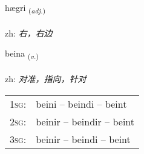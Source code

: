 \documentclass[frontgrid, backgrid]{flacards}\usepackage[]{graphicx}\usepackage[]{color}
\begin{document}
\renewcommand{\flhead}{\vskip5pt \fboxsep=0pt {\small\bfseries\footnotesize Lýsingarorð | 形容词}}
\renewcommand{\fcfoot}{\vskip5pt \fboxsep=0pt \hspace{2pt}{\small\bfseries\footnotesize 2K}}

\renewcommand{\blhead}{\vskip5pt {\small\bfseries\footnotesize Lýsingarorð | 形容词 }}
\renewcommand{\bcfoot}{\vskip5pt \hspace{2pt}{\small\bfseries\footnotesize 2K}}


{hægri \small{\textsubscript{(\textit{adj.})}} \\[1ex] %
\textphonetic{[haiɣrɪ]} \\
zh: \emph{右，右边} \\  [2ex]
\renewcommand*{\arraystretch}{0.8}
}

\renewcommand{\flhead}{\vskip5pt \fboxsep=0pt {\small\bfseries\footnotesize Sagnorð | 动词}}
\renewcommand{\fcfoot}{\vskip5pt \fboxsep=0pt \hspace{2pt}{\small\bfseries\footnotesize 2K}}

\renewcommand{\blhead}{\vskip5pt {\small\bfseries\footnotesize Sagnorð | 动词 }}
\renewcommand{\bcfoot}{\vskip5pt \hspace{2pt}{\small\bfseries\footnotesize 2K}}


{beina \small{\textsubscript{(\textit{v.})}} \\[1ex] %
\textphonetic{[peiːna]} \\
zh: \emph{对准，指向，针对} \\  [2ex]
\renewcommand*{\arraystretch}{0.8}
\begin{tabular}{p{1cm}l}
\textsc{1sg}: & beini -- beindi -- beint \\ 
\textsc{2sg}: & beinir -- beindir -- beint \\ 
\textsc{3sg}: & beinir -- beindi -- beint \\ 
\end{tabular}
}
\end{document}

